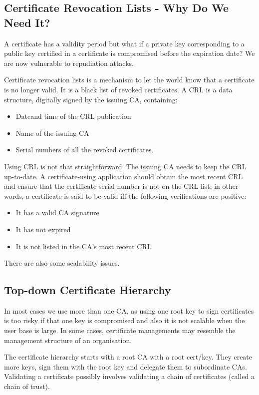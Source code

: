 \documentclass{article}
\begin{document}
\subsection{Certificate Revocation Lists - Why Do We Need It?}
A certificate has a validity period but what if a private key corresponding to a public key certified in a certificate is compromised before the expiration date? We are now vulnerable to repudiation attacks.

Certificate revocation lists is a mechanism to let the world know that a certificate is no longer valid. It is a black list of revoked certificates. A CRL is a data structure, digitally signed by the issuing CA, containing:
\begin{itemize}
  \item Dateand time of the CRL publication
  \item Name of the issuing CA
  \item Serial numbers of all the revoked certificates.
\end{itemize}
Using CRL is not that straightforward. The issuing CA needs to keep the CRL up-to-date. A certificate-using application should obtain the most recent CRL and ensure that the certificate serial number is not on the CRL list; in other words, a certificate is said to be valid iff the following verifications are positive:
\begin{itemize}
  \item It has a valid CA signature
  \item It has not expired
  \item It is not listed in the CA's most recent CRL
\end{itemize}
There are also some scalability issues.

\subsection{Top-down Certificate Hierarchy}
In most cases we use more than one CA, as using one root key to sign certificates is too risky if that one key is compromised and also it is not scalable when the user base is large. In some cases, certificate managements may resemble the management structure of an organisation.

The certificate hierarchy starts with a root CA with a root cert/key. They create more keys, sign them with the root key and delegate them to subordinate CAs. Validating a certificate possibly involves validating a chain of certificates (called a chain of trust).
\end{document}
